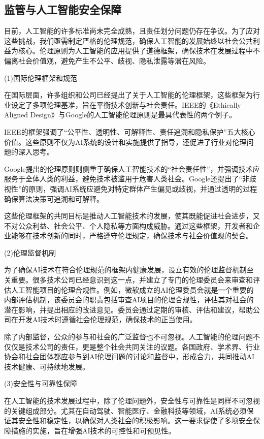 \subsection{监管与人工智能安全保障}
目前，人工智能的许多标准尚未完全成熟，且责任划分问题仍存在争议。为了应对这些挑战，我们亟需制定严格的伦理规范，确保人工智能的发展始终以社会公共利益为核心。伦理原则为人工智能的应用提供了道德框架，确保技术在发展过程中不偏离社会价值观，避免产生不公平、歧视、隐私泄露等潜在风险。

(1)国际伦理框架和规范

在国际层面，许多组织和公司已经提出了关于人工智能的伦理框架，这些框架为行业设定了多项伦理基准，旨在平衡技术创新与社会责任。IEEE的《Ethically Aligned Design》与Google的人工智能伦理原则是最具代表性的两个例子。

IEEE的框架强调了“公平性、透明性、可解释性、责任追溯和隐私保护”五大核心价值。这些原则不仅为AI系统的设计和实施提供了指导，还促进了行业对伦理问题的深入思考。

Google提出的伦理原则则侧重于确保人工智能技术的“社会责任性”，并强调技术应服务于全体人类的利益，避免技术被滥用于危害人类社会。Google还提出了“非歧视性”的原则，强调AI系统应避免对特定群体产生偏见或歧视，并通过透明的过程确保算法决策可追溯和可解释。

这些伦理框架的共同目标是推动人工智能技术的发展，使其既能促进社会进步，又不对公众利益、社会公平、个人隐私等方面构成威胁。通过这些框架，开发者和企业能够在技术创新的同时，严格遵守伦理规定，确保技术与社会价值观的契合。

(2)伦理监督机制

为了确保AI技术在符合伦理规范的框架内健康发展，设立有效的伦理监督机制至关重要。很多技术公司已经意识到这一点，并建立了专门的伦理委员会来审查和评估人工智能项目的伦理合规性。例如，微软成立的AI伦理委员会就是一个重要的内部评估机制，该委员会的职责包括审查AI项目的伦理合规性，评估其对社会的潜在影响，并提出相应的改进意见。委员会通过定期的审核、评估和建议，帮助公司在开发AI技术时遵循社会伦理规范，确保技术的正当使用。

除了内部监督，公众的参与和社会的广泛监督也不可忽视。人工智能的伦理问题不仅仅是技术公司的责任，更是整个社会共同关注的议题。各国政府、学术界、行业协会和社会团体都应参与到AI伦理问题的讨论和监督中，形成合力，共同推动AI技术健康、可持续地发展。

(3)安全性与可靠性保障

在人工智能的技术发展过程中，除了伦理问题外，安全性与可靠性是同样不可忽视的关键组成部分。尤其在自动驾驶、智能医疗、金融科技等领域，AI系统必须保证其安全性和稳定性，以确保对人类社会的积极影响。这一要求促使了多项安全保障措施的实施，旨在增强AI技术的可控性和可预见性。

